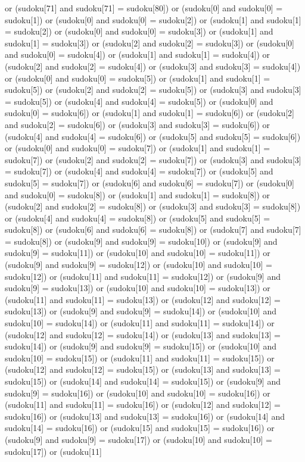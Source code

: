 \documentclass[8pt]{article}
\begin{document}
\begin{algorithm}[H]
or (sudoku[71]  and sudoku[71] = sudoku[80]) or (sudoku[0]  and sudoku[0] = sudoku[1]) or (sudoku[0]  and sudoku[0] = sudoku[2]) or (sudoku[1]  and sudoku[1] = sudoku[2]) or (sudoku[0]  and sudoku[0] = sudoku[3]) or (sudoku[1]  and sudoku[1] = sudoku[3]) or (sudoku[2]  and sudoku[2] = sudoku[3]) or (sudoku[0]  and sudoku[0] = sudoku[4]) or (sudoku[1]  and sudoku[1] = sudoku[4]) or (sudoku[2]  and sudoku[2] = sudoku[4]) or (sudoku[3]  and sudoku[3] = sudoku[4]) or (sudoku[0]  and sudoku[0] = sudoku[5]) or (sudoku[1]  and sudoku[1] = sudoku[5]) or (sudoku[2]  and sudoku[2] = sudoku[5]) or (sudoku[3]  and sudoku[3] = sudoku[5]) or (sudoku[4]  and sudoku[4] = sudoku[5]) or (sudoku[0]  and sudoku[0] = sudoku[6]) or (sudoku[1]  and sudoku[1] = sudoku[6]) or (sudoku[2]  and sudoku[2] = sudoku[6]) or (sudoku[3]  and sudoku[3] = sudoku[6]) or (sudoku[4]  and sudoku[4] = sudoku[6]) or (sudoku[5]  and sudoku[5] = sudoku[6]) or (sudoku[0]  and sudoku[0] = sudoku[7]) or (sudoku[1]  and sudoku[1] = sudoku[7]) or (sudoku[2]  and sudoku[2] = sudoku[7]) or (sudoku[3]  and sudoku[3] = sudoku[7]) or (sudoku[4]  and sudoku[4] = sudoku[7]) or (sudoku[5]  and sudoku[5] = sudoku[7]) or (sudoku[6]  and sudoku[6] = sudoku[7]) or (sudoku[0]  and sudoku[0] = sudoku[8]) or (sudoku[1]  and sudoku[1] = sudoku[8]) or (sudoku[2]  and sudoku[2] = sudoku[8]) or (sudoku[3]  and sudoku[3] = sudoku[8]) or (sudoku[4]  and sudoku[4] = sudoku[8]) or (sudoku[5]  and sudoku[5] = sudoku[8]) or (sudoku[6]  and sudoku[6] = sudoku[8]) or (sudoku[7]  and sudoku[7] = sudoku[8]) or (sudoku[9]  and sudoku[9] = sudoku[10]) or (sudoku[9]  and sudoku[9] = sudoku[11]) or (sudoku[10]  and sudoku[10] = sudoku[11]) or (sudoku[9]  and sudoku[9] = sudoku[12]) or (sudoku[10]  and sudoku[10] = sudoku[12]) or (sudoku[11]  and sudoku[11] = sudoku[12]) or (sudoku[9]  and sudoku[9] = sudoku[13]) or (sudoku[10]  and sudoku[10] = sudoku[13]) or (sudoku[11]  and sudoku[11] = sudoku[13]) or (sudoku[12]  and sudoku[12] = sudoku[13]) or (sudoku[9]  and sudoku[9] = sudoku[14]) or (sudoku[10]  and sudoku[10] = sudoku[14]) or (sudoku[11]  and sudoku[11] = sudoku[14]) or (sudoku[12]  and sudoku[12] = sudoku[14]) or (sudoku[13]  and sudoku[13] = sudoku[14]) or (sudoku[9]  and sudoku[9] = sudoku[15]) or (sudoku[10]  and sudoku[10] = sudoku[15]) or (sudoku[11]  and sudoku[11] = sudoku[15]) or (sudoku[12]  and sudoku[12] = sudoku[15]) or (sudoku[13]  and sudoku[13] = sudoku[15]) or (sudoku[14]  and sudoku[14] = sudoku[15]) or (sudoku[9]  and sudoku[9] = sudoku[16]) or (sudoku[10]  and sudoku[10] = sudoku[16]) or (sudoku[11]  and sudoku[11] = sudoku[16]) or (sudoku[12]  and sudoku[12] = sudoku[16]) or (sudoku[13]  and sudoku[13] = sudoku[16]) or (sudoku[14]  and sudoku[14] = sudoku[16]) or (sudoku[15]  and sudoku[15] = sudoku[16]) or (sudoku[9]  and sudoku[9] = sudoku[17]) or (sudoku[10]  and sudoku[10] = sudoku[17]) or (sudoku[11]  
\end{algorithm}
\end{document}
